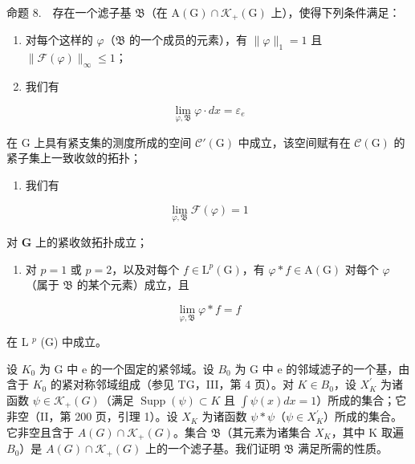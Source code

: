 命题 8.　存在一个滤子基 \(\mathfrak{B}\)（在 \(\mathrm{A}(\mathrm{G}) \cap \mathcal{K}_{+}(\mathrm{G})\) 上），使得下列条件满足：

\begin{enumerate}
\def\labelenumi{(\roman{enumi})}
\item
  对每个这样的 \(\varphi\)（\(\mathfrak{B}\) 的一个成员的元素），有 \(\|\varphi\|_1 = 1\) 且 \(\|\mathcal{F}(\varphi)\|_{\infty} \leqslant 1\)；
\item
  我们有
\end{enumerate}

\[
\lim _ {\varphi , \mathfrak {B}} \varphi \cdot d x = \varepsilon_ {e}
\]

在 G 上具有紧支集的测度所成的空间 \(\mathcal{C}'(\mathrm{G})\) 中成立，该空间赋有在 \(\mathcal{C}(\mathrm{G})\) 的紧子集上一致收敛的拓扑；

\begin{enumerate}
\def\labelenumi{(\roman{enumi})}
\setcounter{enumi}{2}
\tightlist
\item
  我们有
\end{enumerate}

\[
\lim _ {\varphi , \mathfrak {B}} \mathcal {F} (\varphi) = 1
\]

对 \(\widehat{\mathbf{G}}\) 上的紧收敛拓扑成立；

\begin{enumerate}
\def\labelenumi{(\roman{enumi})}
\setcounter{enumi}{3}
\tightlist
\item
  对 \(p = 1\) 或 \(p = 2\)，以及对每个 \(f \in \mathrm{L}^p(\mathrm{G})\)，有 \(\varphi * f \in \mathrm{A}(\mathrm{G})\) 对每个 \(\varphi\)（属于 \(\mathfrak{B}\) 的某个元素）成立，且
\end{enumerate}

\[
\lim _ {\varphi , \mathfrak {B}} \varphi * f = f
\]

在 L \(^{p}\) (G) 中成立。

设 \(K_{0}\) 为 G 中 e 的一个固定的紧邻域。设 \(B_{0}\) 为 G 中 e 的邻域滤子的一个基，由含于 \(K_{0}\) 的紧对称邻域组成（参见 TG，III，第 4 页）。对 \(K \in B_{0}\)，设 \(X_{K}^{\prime}\) 为诸函数 \(\psi \in \mathcal{K}_{+}(G)\)（满足 \(\operatorname{Supp}(\psi) \subset K\) 且 \(\int \psi(x)dx = 1\)）所成的集合；它非空（II，第 200 页，引理 1）。设 \(X_{K}\) 为诸函数 \(\psi * \psi\)（\(\psi \in X_{K}^{\prime}\)）所成的集合。它非空且含于 \(A(G) \cap \mathcal{K}_{+}(G)\)。集合 \(\mathfrak{B}\)（其元素为诸集合 \(X_{K}\)，其中 K 取遍 \(B_{0}\)）是 \(A(G) \cap \mathcal{K}_{+}(G)\) 上的一个滤子基。我们证明 \(\mathfrak{B}\) 满足所需的性质。


